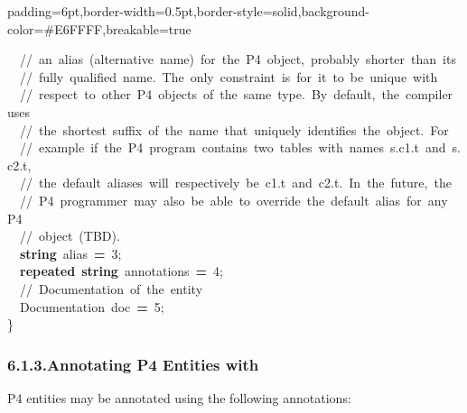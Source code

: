 \documentclass[11pt]{article}
\begin{document}
{\begin{mdbmargintb}{6pt}{6pt}
\begin{mdblock}{padding=6pt,border-width=0.5pt,border-style=solid,background-color=\#E6FFFF,breakable=true}
\begin{mdpre}
{{~~{//~an~alias~(alternative~name)~for~the~P4~object,~probably~shorter~than~its}\\
~~{//~fully~qualified~name.~The~only~constraint~is~for~it~to~be~unique~with}\\
~~{//~respect~to~other~P4~objects~of~the~same~type.~By~default,~the~compiler~uses}\\
~~{//~the~shortest~suffix~of~the~name~that~uniquely~identifies~the~object.~For}\\
~~{//~example~if~the~P4~program~contains~two~tables~with~names~s.c1.t~and~s.c2.t,}\\
~~{//~the~default~aliases~will~respectively~be~c1.t~and~c2.t.~In~the~future,~the}\\
~~{//~P4~programmer~may~also~be~able~to~override~the~default~alias~for~any~P4}\\
~~{//~object~(TBD).}\\
~~{\bfseries{string}}~alias~{\bfseries{=}}~{3};\\
~~{\bfseries{repeated}}~{\bfseries{string}}~annotations~{\bfseries{=}}~{4};\\
~~{//~Documentation~of~the~entity}\\
~~Documentation~doc~{\bfseries{=}}~{5};\\
\}}}%
\end{mdpre}%
\end{mdblock}%
\end{mdbmargintb}%

\subsubsection{6.1.3.\hspace*{0.5em}Annotating P4 Entities with }\label{sec-annotating-p4-entities-with-documentation}%

\noindent{}P4 entities may be annotated using the following annotations:%

}
\end{document}
